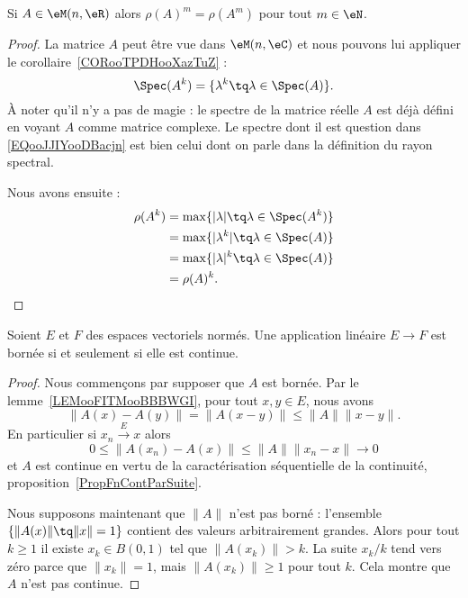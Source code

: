 \begin{proposition}     \label{PROPooYPLGooWKLbPA}
    Si \( A\in \eM(n,\eR)\) alors \( \rho(A)^m=\rho(A^m)\) pour tout \( m\in \eN\).
\end{proposition}

\begin{proof}
    La matrice \( A\) peut être vue dans \( \eM(n,\eC)\) et nous pouvons lui appliquer le corollaire~\ref{CORooTPDHooXazTuZ} :
    \begin{equation}        \label{EQooJJIYooDBacjn}
        \Spec(A^k)=\{ \lambda^k\tq \lambda\in\Spec(A) \}.
    \end{equation}
    À noter qu'il n'y a pas de magie : le spectre de la matrice réelle \( A\) est déjà défini en voyant \( A\) comme matrice complexe. Le spectre dont il est question dans \eqref{EQooJJIYooDBacjn} est bien celui dont on parle dans la définition du rayon spectral.

    Nous avons ensuite :
    \begin{subequations}
        \begin{align}
            \rho(A^k)&=\max\{ | \lambda |\tq \lambda\in\Spec(A^k) \}\\
            &=\max\{ | \lambda^k |\tq \lambda\in\Spec(A) \}\\
            &=\max\{ | \lambda |^k\tq\lambda\in\Spec(A) \}\\
            &=\rho(A)^k.
        \end{align}
    \end{subequations}
\end{proof}

\begin{proposition}       \label{PROPooQZYVooYJVlBd}
    Soient \( E\) et \( F\) des espaces vectoriels normés. Une application linéaire \( E\to F\) est bornée si et seulement si elle est continue.
\end{proposition}

\begin{proof}
    Nous commençons par supposer que \( A\) est bornée. Par le lemme~\ref{LEMooFITMooBBBWGI}, pour tout \( x,y\in E\), nous avons
    \begin{equation}
        \| A(x)-A(y) \|=\| A(x-y) \|\leq \| A \|\| x-y \|.
    \end{equation}
    En particulier si \( x_n\stackrel{E}{\longrightarrow}x\) alors
    \begin{equation}
        0\leq \| A(x_n)-A(x) \|\leq \| A \|\| x_n-x \|\to 0
    \end{equation}
    et \( A\) est continue en vertu de la caractérisation séquentielle de la continuité, proposition~\ref{PropFnContParSuite}.

    Nous supposons maintenant que \( \| A \|\) n'est pas borné : l'ensemble \( \{ \| A(x) \|\tq \| x \|=1 \}\) contient des valeurs arbitrairement grandes. Alors pour tout \( k\geq 1\) il existe \( x_k\in B(0,1)\) tel que \( \| A(x_k) \|>k\). La suite \( x_k/k\) tend vers zéro parce que \( \| x_k \|=1\), mais \( \| A(x_k) \|\geq 1\) pour tout \( k\). Cela montre que \( A\) n'est pas continue.
\end{proof}

